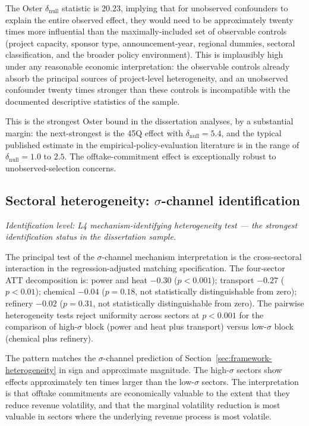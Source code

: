 \documentclass[12pt,a4paper]{article}
\theoremstyle{plain}
\theoremstyle{definition}
\begin{document}
The Oster $\delta_{\text{null}}$ statistic is $20.23$, implying that for unobserved confounders to explain the entire observed effect, they would need to be approximately twenty times more influential than the maximally-included set of observable controls (project capacity, sponsor type, announcement-year, regional dummies, sectoral classification, and the broader policy environment). This is implausibly high under any reasonable economic interpretation: the observable controls already absorb the principal sources of project-level heterogeneity, and an unobserved confounder twenty times stronger than these controls is incompatible with the documented descriptive statistics of the sample.

This is the strongest Oster bound in the dissertation analyses, by a substantial margin: the next-strongest is the 45Q effect with $\delta_{\text{null}} = 5.4$, and the typical published estimate in the empirical-policy-evaluation literature is in the range of $\delta_{\text{null}} = 1.0$ to $2.5$. The offtake-commitment effect is exceptionally robust to unobserved-selection concerns.

\subsection{Sectoral heterogeneity: $\sigma$-channel identification}
\label{sec:results-sectoral}

\noindent\emph{Identification level: L4 mechanism-identifying heterogeneity test --- the strongest identification status in the dissertation sample.}

The principal test of the $\sigma$-channel mechanism interpretation is the cross-sectoral interaction in the regression-adjusted matching specification. The four-sector ATT decomposition is: power and heat $-0.30$ ($p < 0.001$); transport $-0.27$ ($p < 0.01$); chemical $-0.04$ ($p = 0.18$, not statistically distinguishable from zero); refinery $-0.02$ ($p = 0.31$, not statistically distinguishable from zero). The pairwise heterogeneity tests reject uniformity across sectors at $p < 0.001$ for the comparison of high-$\sigma$ block (power and heat plus transport) versus low-$\sigma$ block (chemical plus refinery).

The pattern matches the $\sigma$-channel prediction of Section~\ref{sec:framework-heterogeneity} in sign and approximate magnitude. The high-$\sigma$ sectors show effects approximately ten times larger than the low-$\sigma$ sectors. The interpretation is that offtake commitments are economically valuable to the extent that they reduce revenue volatility, and that the marginal volatility reduction is most valuable in sectors where the underlying revenue process is most volatile.
\end{document}
